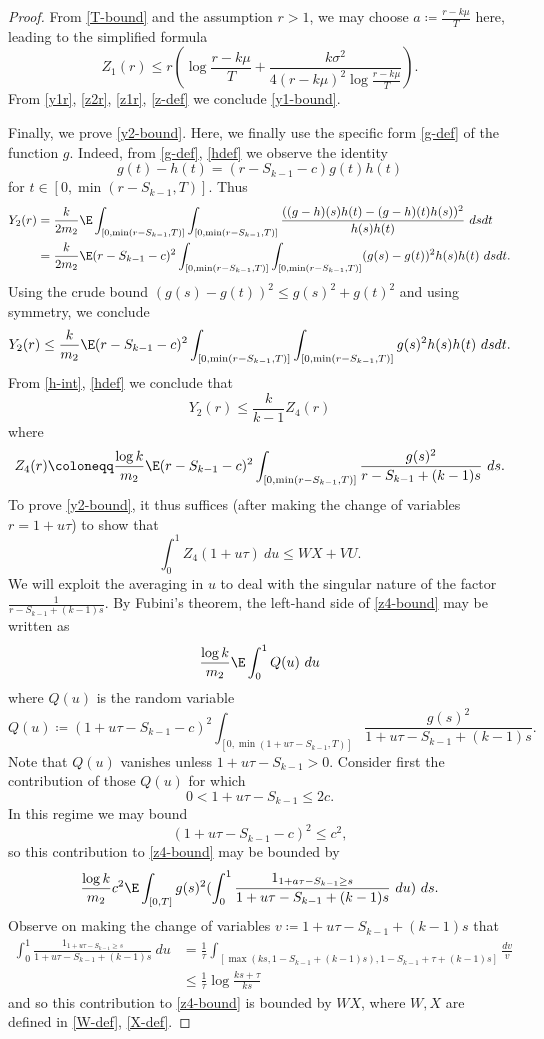 \begin{proof}
From \eqref{T-bound} and the assumption $r > 1$, we may choose $a \coloneqq \frac{r-k\mu}{T}$ here, leading to the simplified formula
\begin{equation}\label{z1r}
Z_1(r) \leq r ( \log \frac{r-k\mu}{T} + \frac{k\sigma^2}{4(r-k\mu)^2 \log \frac{r-k\mu}{T}}).
\end{equation}
From \eqref{y1r}, \eqref{z2r}, \eqref{z1r}, \eqref{z-def} we conclude \eqref{y1-bound}.

Finally, we prove \eqref{y2-bound}.  Here, we finally use the specific form \eqref{g-def} of the function $g$.  Indeed, from \eqref{g-def}, \eqref{hdef} we observe the identity
$$ g(t) - h(t) = (r - S_{k-1} - c) g(t) h(t)$$
for $t \in [0, \min(r-S_{k-1},T)]$.  Thus
\begin{align*}
Y_2(r) &= \frac{k}{2 m_2} \E \int_{[0,\min(r-S_{k-1},T)]} \int_{[0,\min(r-S_{k-1},T)]} \frac{((g-h)(s) h(t)-(g-h)(t) h(s))^2}{h(s) h(t)}\ ds dt \\
&= \frac{k}{2 m_2} \E (r - S_{k-1} - c)^2 \int_{[0,\min(r-S_{k-1},T)]} \int_{[0,\min(r-S_{k-1},T)]} (g(s)-g(t))^2 h(s) h(t)\ ds dt.
\end{align*}
Using the crude bound $(g(s)-g(t))^2 \leq g(s)^2+g(t)^2$ and using symmetry, we conclude
$$Y_2(r) \leq \frac{k}{m_2} \E (r - S_{k-1} - c)^2 \int_{[0,\min(r-S_{k-1},T)]} \int_{[0,\min(r-S_{k-1},T)]} g(s)^2 h(s) h(t)\ ds dt.$$
From \eqref{h-int}, \eqref{hdef} we conclude that
$$ Y_2(r) \leq \frac{k}{k-1} Z_4(r)$$
where
$$ Z_4(r) \coloneqq \frac{\log k}{m_2} \E (r - S_{k-1} - c)^2 \int_{[0,\min(r-S_{k-1},T)]} \frac{g(s)^2}{r-S_{k-1}+(k-1)s}\ ds.$$
To prove \eqref{y2-bound}, it thus suffices (after making the change of variables $r = 1 + u \tau$) to show that
\begin{equation}\label{z4-bound}
 \int_0^1 Z_4(1+u\tau)\ du \leq WX+VU.
\end{equation}
We will exploit the averaging in $u$ to deal with the singular nature of the factor $\frac{1}{r-S_{k-1}+(k-1)s}$.  By Fubini's theorem, the left-hand side of \eqref{z4-bound} may be written as
$$ \frac{\log k}{m_2} \E \int_0^1 Q(u)\ du $$
where $Q(u)$ is the random variable
$$ Q(u) \coloneqq (1+u\tau - S_{k-1} - c)^2 \int_{[0,\min(1+u\tau-S_{k-1},T)]} \frac{g(s)^2}{1+u\tau-S_{k-1}+(k-1)s}.$$
Note that $Q(u)$ vanishes unless $1+u\tau-S_{k-1} > 0$.  Consider first the contribution of those $Q(u)$ for which
$$ 0 < 1+u\tau-S_{k-1} \leq 2c.$$
In this regime we may bound
$$ (1+u\tau-S_{k-1}-c)^2 \leq c^2,$$
so this contribution to \eqref{z4-bound} may be bounded by
$$ \frac{\log k}{m_2} c^2 \E \int_{[0,T]} g(s)^2 (\int_0^1 \frac{1_{1+a\tau-S_{k-1} \geq s}}{1+u\tau-S_{k-1}+(k-1)s}\ du)\ ds.$$
Observe on making the change of variables $v \coloneqq 1 + u\tau - S_{k-1} + (k-1)s$ that 
\begin{align*}
\int_0^1 \frac{1_{1+u\tau-S_{k-1} \geq s}}{1+u\tau-S_{k-1}+(k-1)s}\ du &= \frac{1}{\tau} \int_{[\max(ks, 1-S_{k-1}+(k-1)s), 1-S_{k-1}+\tau+(k-1)s]} \frac{dv}{v} \\
&\leq \frac{1}{\tau} \log \frac{ks+\tau}{ks}
\end{align*}
and so this contribution to \eqref{z4-bound} is bounded by $WX$, where $W,X$ are defined in \eqref{W-def}, \eqref{X-def}.


\end{proof}
